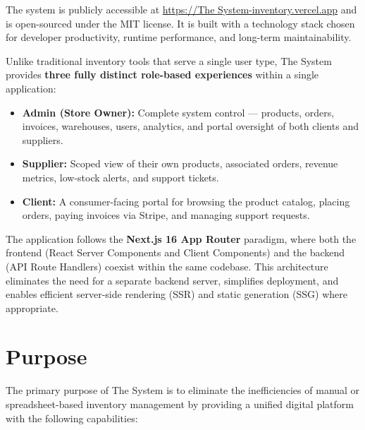 \documentclass[12pt,a4paper]{report}
\begin{document}
The system is publicly accessible at \url{https://The System-inventory.vercel.app} and is open-sourced under the MIT license. It is built with a technology stack chosen for developer productivity, runtime performance, and long-term maintainability.

\begin{tcolorbox}[infobox,title={Three-Role Architecture}]
Unlike traditional inventory tools that serve a single user type, The System provides \textbf{three fully distinct role-based experiences} within a single application:
\begin{itemize}[leftmargin=1.5em]
  \item \textbf{Admin (Store Owner):} Complete system control --- products, orders, invoices, warehouses, users, analytics, and portal oversight of both clients and suppliers.
  \item \textbf{Supplier:} Scoped view of their own products, associated orders, revenue metrics, low-stock alerts, and support tickets.
  \item \textbf{Client:} A consumer-facing portal for browsing the product catalog, placing orders, paying invoices via Stripe, and managing support requests.
\end{itemize}
\end{tcolorbox}

The application follows the \textbf{Next.js 16 App Router} paradigm, where both the frontend (React Server Components and Client Components) and the backend (API Route Handlers) coexist within the same codebase. This architecture eliminates the need for a separate backend server, simplifies deployment, and enables efficient server-side rendering (SSR) and static generation (SSG) where appropriate.

\section{Purpose}

The primary purpose of The System is to eliminate the inefficiencies of manual or spreadsheet-based inventory management by providing a unified digital platform with the following capabilities:
\end{document}
